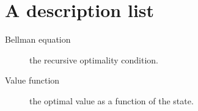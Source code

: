 \section{A description list}

\begin{description}
\item[Bellman equation] the recursive optimality condition.
\item[Value function] the optimal value as a function of the state.
\end{description}
